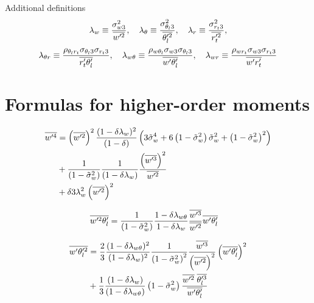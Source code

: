 \documentclass[10pt]{beamer}
\numberwithin{equation}{section}
\begin{document}
    \begin{frame}{Additional definitions}
        \begin{align}
            \label{eq:lambda}
            \lambda_w \equiv \frac{\sigma_{w 3}^2}{\overline{w'^2}}, \quad
            \lambda_\theta \equiv \frac{\sigma_{\theta_l 3}^2}{\overline{\theta_l'^2}}, \quad
            \lambda_r \equiv \frac{\sigma_{r_t 3}^2}{\overline{r_t'^2}},
        \end{align}
        \begin{align}
            \label{eq:lambda_two}
            \lambda_{\theta r} \equiv
            \frac{\rho_{\theta_l r_t} \sigma_{\theta_l 3} \sigma_{r_t 3}}{\overline{r_t' \theta_l'}}, \quad
            \lambda_{w \theta} \equiv
            \frac{\rho_{w \theta_l} \sigma_{w 3} \sigma_{\theta_l 3}}{\overline{w' \theta_l'}}, \quad
            \lambda_{w r} \equiv
            \frac{\rho_{w r_t} \sigma_{w 3} \sigma_{r_t 3}}{\overline{w' r_t'}}
        \end{align}
    \end{frame}


    \section{Formulas for higher-order moments}\label{sec:formulas-for-higher-order-moments}

    \begin{frame}
        \begin{align}
            \label{eq:wp4}
            \overline{w'^4}
            &= \left(\overline{w'^2}\right)^2
            \frac{(1-\delta \lambda_w)^2}{(1-\delta)}
            \left(3 {\tilde{\sigma}_w}^4 + 6 \left( 1 - \tilde{\sigma}_w^2 \right) {\tilde{\sigma}_w}^2 + \left( 1 - \tilde{\sigma}_w^2 \right)^2\right) \nonumber\\
            &+ \frac{1}{\left( 1 - \tilde{\sigma}_w^2 \right)} \frac{1}{(1-\delta \lambda_w)}
            \frac{\left(\overline{w'^3}\right)^2}{\overline{w'^2}} \nonumber\\
            &+ \delta 3 \lambda_w^2 \left(\overline{w'^2}\right)^2
        \end{align}
    \end{frame}

    \begin{frame}
        \begin{align}
            \label{eq:wp2thlp_solved}
            \overline{w'^2 \theta_l'}
            &= \frac{1}{\left( 1 - \tilde{\sigma}_w^2 \right)} \frac{1 - \delta \lambda_{w\theta}}{1-\delta \lambda_w} \frac{\overline{w'^3}}{\overline{w'^2}} \overline{w' \theta_l'}
        \end{align}
    \end{frame}

    \begin{frame}
        \begin{align}
            \label{eq:wpthlp2_solved}
            \overline{w' \theta_l'^2}
            &= \frac{2}{3} \frac{(1-\delta \lambda_{w \theta})^2}{(1-\delta \lambda_w)^2} \frac{1}{\left( 1 - \tilde{\sigma}_w^2 \right)^2} \frac{\overline{w'^3}}{\left(\overline{w'^2} \right)^2} \left(\overline{w' \theta_l'} \right)^2 \nonumber\\
            &+ \frac{1}{3} \frac{(1-\delta \lambda_w)}{(1-\delta \lambda_{w \theta})} \left( 1 - \tilde{\sigma}_w^2 \right) \frac{\overline{w'^2} \; \overline{\theta_l'^3}}{\overline{w' \theta_l'}}
        \end{align}
    \end{frame}
\end{document}
